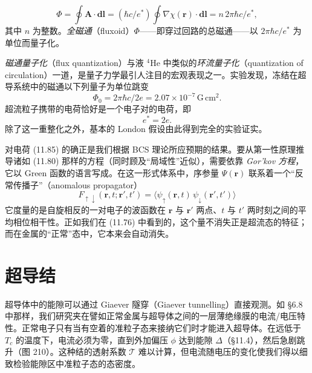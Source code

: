 \begin{equation*}
\Phi = \oint \mathbf{A}\cdot\mathbf{dl} = (\hbar c/e^{*}) \oint \nabla\chi(\mathbf{r})\cdot\mathbf{dl} = n\,2\pi\hbar c/e^{*},
\tag{11.83}
\end{equation*}
其中 $n$ 为整数。\emph{全磁通}（fluxoid）$\Phi$——即穿过回路的总磁通——以 $2\pi\hbar c/e^{*}$ 为单位而量子化。

\emph{磁通量子化}（flux quantization）与液 $^{4}$He 中类似的\emph{环流量子化}（quantization of circulation）一道，是量子力学最引人注目的宏观表现之一。实验发现，冻结在超导系统中的磁通以下列量子为单位跳变
\begin{equation*}
\Phi_0 = 2\pi\hbar c/2e = 2.07\times 10^{-7}\,\mathrm{G\,cm^{2}}.
\tag{11.84}
\end{equation*}
超流粒子携带的电荷恰好是一个电子对的电荷，即
\begin{equation*}
e^{*} = 2e.
\tag{11.85}
\end{equation*}
除了这一重整化之外，基本的 London 假设由此得到完全的实验证实。

对电荷 (11.85) 的确正是我们根据 BCS 理论所应预期的结果。要从第一性原理推导诸如 (11.80) 那样的方程（同时顾及“局域性”近似），需要依靠 \emph{Gor'kov 方程}，它以 Green 函数的语言写成。在这一形式体系中，序参量 $\Psi(\mathbf{r})$ 联系着一个“反常传播子”（anomalous propagator）
\begin{equation*}
F_{\uparrow\downarrow}(\mathbf{r}, t; \mathbf{r}', t') = \langle \psi_\uparrow(\mathbf{r}, t)\,\psi_\downarrow(\mathbf{r}', t') \rangle
\tag{11.86}
\end{equation*}
它度量的是自旋相反的一对电子的波函数在 $\mathbf{r}$ 与 $\mathbf{r}'$ 两点、$t$ 与 $t'$ 两时刻之间的平均相位相干性。正如我们在 (11.76) 中看到的，这个量不消失正是超流态的特征；而在金属的“正常”态中，它本来会自动消失。

\section{超导结}

超导体中的能隙可以通过 Giaever 隧穿（Giaever tunnelling）直接观测。如 §6.8 中那样，我们研究夹在譬如正常金属与超导体之间的一层薄绝缘膜的电流/电压特性。正常电子只有当有空着的准粒子态来接纳它们时才能进入超导体。在远低于 $T_c$ 的温度下，电流必须为零，直到外加偏压 $\phi$ 达到能隙 $\Delta$（§11.4），然后急剧跳升（图 210）。这种结的透射系数 $\mathcal{T}$ 难以计算，但电流随电压的变化使我们得以细致检验能隙区中准粒子态的态密度。

